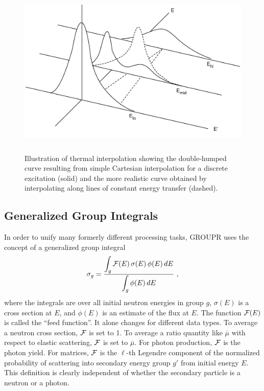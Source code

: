 \begin{figure}[tp]\centering
\includegraphics[keepaspectratio, height=3.25in, angle=0]{figs/groupr5}
\caption[Interpolation along lines of constant energy transfer]{Illustration of
 thermal interpolation showing the double-humped curve resulting from simple
 Cartesian interpolation for a discrete excitation (solid) and the more
 realistic curve obtained by interpolating along lines of constant energy
 transfer (dashed).}
\label{gr5}
\end{figure}

\subsection{Generalized Group Integrals}
\label{ssGROUPR_GrpInt}

In order to unify many formerly different processing tasks, GROUPR uses
the concept of a generalized group integral
  \begin{equation}
    \sigma_g={\displaystyle{\int_g {\cal F}(E)\,\sigma(E)\,\phi(E)\,dE}
    \over\displaystyle{\int_g\phi(E)\,dE}}\,\,,
  \label{Eq70}
  \end{equation}
where the integrals are over all initial neutron energies in group $g$,
$\sigma(E)$ is a cross section at $E$, and $\phi(E)$ is an estimate of
the flux at $E$.  The function ${\cal F}(E)$ is called the ``feed function''.
It alone changes for different data types.  To average a neutron cross
section, ${\cal F}$ is set to 1.  To average a ratio quantity like
$\overline \mu$ with respect to elastic scattering, ${\cal F}$ is set
to $\overline \mu$.  For photon production, ${\cal F}$ is the photon yield.
For matrices, ${\cal F}$ is the  $\ell$-th Legendre component of
the normalized probability of scattering into secondary energy group
$g'$ from initial energy $E$.  This definition is clearly independent of
whether the secondary particle is a neutron or a photon.

